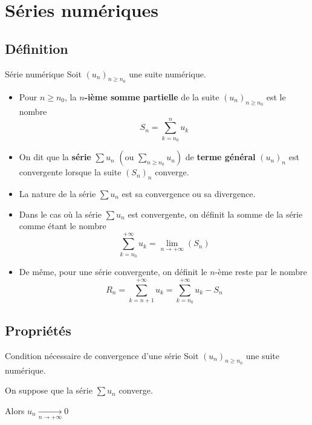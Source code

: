 
\section{Séries numériques}

    \subsection{Définition}

    \begin{defi}{Série numérique}{}
        Soit $(u_n)_{n \geq n_0}$ une suite numérique.
        \begin{itemize}
            \item Pour $n \geq n_0$, la \textbf{$n$-ième somme partielle} de la suite $(u_n)_{n \geq n_0}$ est le nombre \[ S_n = \sum\limits_{k=n_0}^n u_k \]
            \item On dit que la \textbf{série} $\sum u_n$ $\left(\text{ou } \sum\limits_{n \geq n_0} u_n \right)$ de \textbf{terme général} $(u_n)_n$ est convergente lorsque la suite $(S_n)_n$ converge.
            \item La nature de la série $\sum u_n$ est sa convergence ou sa divergence.
            \item Dans le cas où la série $\sum u_n$ est convergente, on définit la somme de la série comme étant le nombre \[ \sum\limits_{k = n_0}^{+\infty} u_k = \lim\limits_{n \rightarrow +\infty} (S_n) \]
            \item De même, pour une série convergente, on définit le $n$-ème reste par le nombre 
            \[ R_n = \sum\limits_{k = n+1}^{+\infty} u_k = \sum\limits_{k = n_0}^{+\infty} u_k - S_n \]
        \end{itemize}
    \end{defi}

    \subsection{Propriétés}

    \begin{prop}{Condition nécessaire de convergence d’une série}{}
        Soit $(u_n)_{n \geq n_0}$ une suite numérique.

        On suppose que la série $\sum u_n$ converge.

        Alors $u_n \underset{n \rightarrow +\infty}{\longrightarrow} 0$
    \end{prop}

